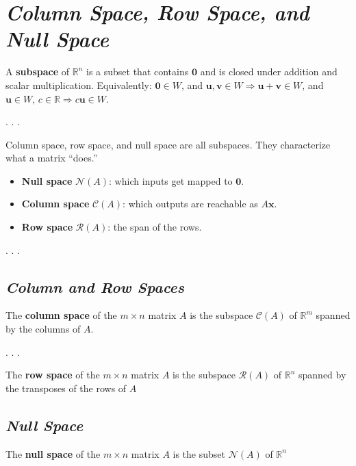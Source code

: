 \documentclass[
  letterpaper,
  DIV=11,
  numbers=noendperiod]{scrartcl}
\providecommand{\tightlist}{%
  \setlength{\itemsep}{0pt}\setlength{\parskip}{0pt}}\usepackage{longtable,booktabs,array}
\begin{document}
\section{\texorpdfstring{\emph{Column Space, Row Space, and Null
Space}}{Column Space, Row Space, and Null Space}}\label{column-space-row-space-and-null-space}

A \textbf{subspace} of \(\mathbb{R}^n\) is a subset that contains
\(\mathbf{0}\) and is closed under addition and scalar multiplication.
Equivalently: \(\mathbf{0} \in W\), and
\(\mathbf{u},\mathbf{v} \in W \Rightarrow \mathbf{u}+\mathbf{v} \in W\),
and
\(\mathbf{u} \in W,\, c \in \mathbb{R} \Rightarrow c\mathbf{u} \in W\).

. . .

Column space, row space, and null space are all subspaces. They
characterize what a matrix ``does.''

\begin{itemize}
\tightlist
\item
  \textbf{Null space} \(\mathcal{N}(A)\): which inputs get mapped to
  \(\mathbf{0}\).
\item
  \textbf{Column space} \(\mathcal{C}(A)\): which outputs are reachable
  as \(A\mathbf{x}\).
\item
  \textbf{Row space} \(\mathcal{R}(A)\): the span of the rows.
\end{itemize}

. . .

\subsection{\texorpdfstring{\emph{Column and Row
Spaces}}{Column and Row Spaces}}\label{column-and-row-spaces}

The \textbf{column space} of the \(m \times n\) matrix \(A\) is the
subspace \(\mathcal{C}(A)\) of \(\mathbb{R}^{m}\) spanned by the columns
of \(A\).

. . .

The \textbf{row space} of the \(m \times n\) matrix \(A\) is the
subspace \(\mathcal{R}(A)\) of \(\mathbb{R}^{n}\) spanned by the
transposes of the rows of \(A\)

\subsection{\texorpdfstring{\emph{Null
Space}}{Null Space}}\label{null-space}

The \textbf{null space} of the \(m \times n\) matrix \(A\) is the subset
\(\mathcal{N}(A)\) of \(\mathbb{R}^{n}\)
\end{document}
